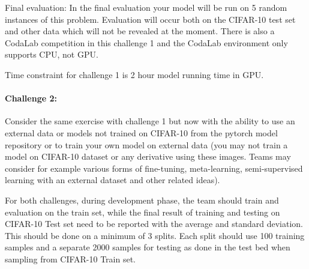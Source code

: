 \documentclass[10pt,twocolumn,letterpaper]{article}
\begin{document}
Final evaluation: In the final evaluation your model will be run on 5 random instances of this problem. Evaluation will occur both on the CIFAR-10 test set and other data which will not be revealed at the moment. There is also a CodaLab competition in this challenge 1 and the CodaLab environment only supports CPU, not GPU.

Time constraint for challenge 1 is 2 hour model running time in GPU.

\paragraph{Challenge 2:}
Consider the same exercise with challenge 1 but now with the ability to use an external data or models not trained on CIFAR-10 from the pytorch model repository or to train your own model on external data (you may not train a model on CIFAR-10 dataset or any derivative using these images.
Teams may consider for example various forms of fine-tuning, meta-learning, semi-supervised learning with an external dataset and other related ideas).

For both challenges, during development phase, the team should train and evaluation on the train set, while the final result of training and testing on CIFAR-10 Test set need to be reported with the average and standard deviation. This should be done on a minimum of 3 splits. Each split should use 100 training samples and a separate 2000 samples for testing as done in the test bed when sampling from CIFAR-10 Train set.
\end{document}
